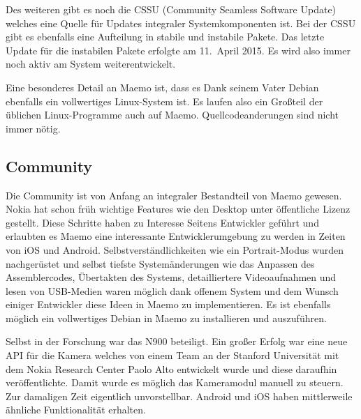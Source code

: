 Des weiteren gibt es noch die CSSU\thinspace\cite{online:maemo-cssu} (Community Seamless Software Update) welches eine Quelle für Updates integraler Systemkomponenten ist. Bei der CSSU gibt es ebenfalls eine Aufteilung in stabile und instabile Pakete. Das letzte Update für die instabilen Pakete erfolgte am 11.\ April 2015\thinspace\cite{online:maemo-cssuchangelog}. Es wird also immer noch aktiv am System weiterentwickelt.

Eine besonderes Detail an Maemo ist, dass es Dank seinem Vater Debian ebenfalls ein vollwertiges Linux-System ist. Es laufen also ein Großteil der üblichen Linux-Programme auch auf Maemo. Quellcodeanderungen sind nicht immer nötig.\
\newline

\subsection{Community}
Die Community ist von Anfang an integraler Bestandteil von Maemo gewesen. Nokia hat schon früh wichtige Features wie den Desktop unter öffentliche Lizenz gestellt\thinspace\cite{online:maemo-hildon}. Diese Schritte haben zu Interesse Seitens Entwickler geführt und erlaubten es Maemo eine interessante Entwicklerumgebung zu werden in Zeiten von iOS und Android. Selbstverständlichkeiten wie ein Portrait-Modus wurden nachgerüstet\thinspace\cite{online:maemo-portrait} und selbst tiefste Systemänderungen wie das Anpassen des Assemblercodes\thinspace\cite{online:maemo-thumb}, Übertakten des Systems\thinspace\cite{online:maemo-overclocking}, detailliertere Videoaufnahmen\thinspace\cite{online:maemo-hdvideo} und lesen von USB-Medien\thinspace\cite{online:maemo-usbhost}  waren möglich dank offenem System und dem Wunsch einiger Entwickler diese Ideen in Maemo zu implementieren.
Es ist ebenfalls möglich ein vollwertiges Debian in Maemo zu installieren und auszuführen\thinspace\cite{online:maemo-easydebian}\thinspace\cite{online:maemo-easydebianwiki}.

Selbst in der Forschung war das N900 beteiligt. Ein großer Erfolg war eine neue API für die Kamera welches von einem Team an der Stanford Universität mit dem Nokia Research Center Paolo Alto entwickelt wurde und diese daraufhin veröffentlichte\thinspace\cite{online:maemo-fcam}.
Damit wurde es möglich das Kameramodul manuell zu steuern. Zur damaligen Zeit eigentlich unvorstellbar.
Android und iOS haben mittlerweile ähnliche Funktionalität erhalten\thinspace\cite{online:maemo-fcamlegacy}.

